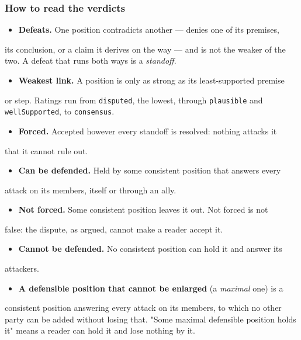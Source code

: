 \documentclass[11pt]{article}
\begin{document}
\subsubsection*{How to read the verdicts}
\begin{itemize}
  \item \textbf{Defeats.} One position contradicts another — denies one of its premises,
\end{itemize}
  its conclusion, or a claim it derives on the way — and is not the weaker of   the two. A defeat that runs both ways is a \emph{standoff}.

\begin{itemize}
  \item \textbf{Weakest link.} A position is only as strong as its least-supported premise
\end{itemize}
  or step. Ratings run from \texttt{disputed}, the lowest, through \texttt{plausible} and   \texttt{well\allowbreak{}Supported}, to \texttt{consensus}.

\begin{itemize}
  \item \textbf{Forced.} Accepted however every standoff is resolved: nothing attacks it
\end{itemize}
  that it cannot rule out.

\begin{itemize}
  \item \textbf{Can be defended.} Held by some consistent position that answers every
\end{itemize}
  attack on its members, itself or through an ally.

\begin{itemize}
  \item \textbf{Not forced.} Some consistent position leaves it out. Not forced is not
\end{itemize}
  false: the dispute, as argued, cannot make a reader accept it.

\begin{itemize}
  \item \textbf{Cannot be defended.} No consistent position can hold it and answer its
\end{itemize}
  attackers.

\begin{itemize}
  \item \textbf{A defensible position that cannot be enlarged} (a \emph{maximal} one) is a
\end{itemize}
  consistent position answering every attack on its members, to which no other   party can be added without losing that. "Some maximal defensible position   holds it" means a reader can hold it and lose nothing by it.
\end{document}
